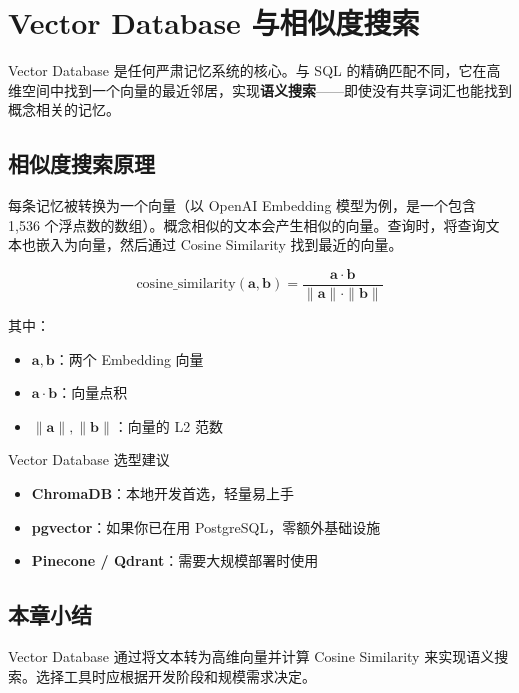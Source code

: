 \section{Vector Database 与相似度搜索}

Vector Database 是任何严肃记忆系统的核心。与 SQL 的精确匹配不同，它在高维空间中找到一个向量的最近邻居，实现\textbf{语义搜索}——即使没有共享词汇也能找到概念相关的记忆。

\subsection{相似度搜索原理}

每条记忆被转换为一个向量（以 OpenAI Embedding 模型为例，是一个包含 1,536 个浮点数的数组）。概念相似的文本会产生相似的向量。查询时，将查询文本也嵌入为向量，然后通过 Cosine Similarity 找到最近的向量。

$$
\text{cosine\_similarity}(\mathbf{a}, \mathbf{b}) = \frac{\mathbf{a} \cdot \mathbf{b}}{\|\mathbf{a}\| \cdot \|\mathbf{b}\|}
$$

其中：
\begin{itemize}[leftmargin=2em]
    \item $\mathbf{a}, \mathbf{b}$：两个 Embedding 向量
    \item $\mathbf{a} \cdot \mathbf{b}$：向量点积
    \item $\|\mathbf{a}\|, \|\mathbf{b}\|$：向量的 L2 范数
\end{itemize}

\begin{knowledgebox}{Vector Database 选型建议}
\begin{itemize}[leftmargin=1.5em]
    \item \textbf{ChromaDB}：本地开发首选，轻量易上手
    \item \textbf{pgvector}：如果你已在用 PostgreSQL，零额外基础设施
    \item \textbf{Pinecone / Qdrant}：需要大规模部署时使用
\end{itemize}
\end{knowledgebox}

\subsection{本章小结}

Vector Database 通过将文本转为高维向量并计算 Cosine Similarity 来实现语义搜索。选择工具时应根据开发阶段和规模需求决定。

